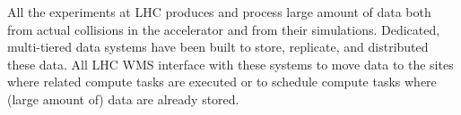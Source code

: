 All the experiments at LHC produces and process large amount of data both from
actual collisions in the accelerator and from their simulations. Dedicated,
multi-tiered data systems have been built to store, replicate, and distributed
these data. All LHC WMS interface with these systems to move data to the sites
where related compute tasks are executed or to schedule compute tasks where
(large amount of) data are already stored.




